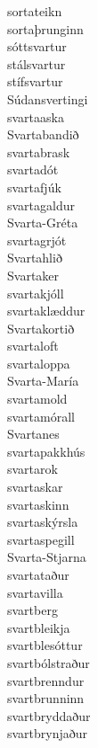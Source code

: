\documentclass[../samsetningasafn.tex]{subfiles}
\begin{document}
\begin{bigwordlist}
\begin{footnotesize}
\begin{multicols}{4}
\begin{description}
		\item [sortateikn]
		\item [sortaþrunginn]
		\item [sóttsvartur]
		\item [stálsvartur]
		\item [stífsvartur]
		\item [Súdansvertingi]
		\item [svartaaska]
		\item [Svartabandið]
		\item [svartabrask]
		\item [svartadót]
		\item [svartafjúk]
		\item [svartagaldur]
		\item [Svarta-Gréta]
		\item [svartagrjót]
		\item [Svartahlið]
		\item [Svartaker]
		\item [svartakjóll]
		\item [svartaklæddur]
		\item [Svartakortið]
		\item [svartaloft]
		\item [svartaloppa]
		\item [Svarta-María]
		\item [svartamold]
		\item [svartamórall]
		\item [Svartanes]
		\item [svartapakkhús]
		\item [svartarok]
		\item [svartaskar]
		\item [svartaskinn]
		\item [svartaskýrsla]
		\item [svartaspegill]
		\item [Svarta-Stjarna]
		\item [svartataður]
		\item [svartavilla]
		\item [svartberg]
		\item [svartbleikja]
		\item [svartblesóttur]
		\item [svartbólstraður]
		\item [svartbrenndur]
		\item [svartbrunninn]
		\item [svartbryddaður]
		\item [svartbrynjaður]	

\end{description}
\end{multicols}
\end{footnotesize}
\end{bigwordlist}
\end{document}
